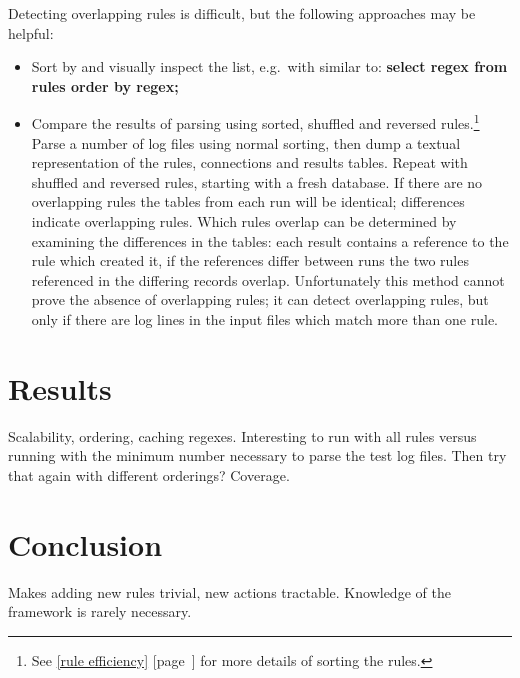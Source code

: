 \documentclass[]{svmult}
\newcommand{\refwithpage}[1]{%
    \empty{}\ref{#1} [page~\pageref{#1}]%
}
\newcommand{\sectionref}[1]{%
    \textsection{}\refwithpage{#1}%
}
\begin{document}
Detecting overlapping rules is difficult, but the following approaches may
be helpful:

\begin{itemize}

    \item Sort by \regex{} and visually inspect the list, e.g.\ with \SQL{}
        similar to: \textbf{select regex from rules order by regex;}

    \item Compare the results of parsing using sorted, shuffled and
        reversed rules.\footnote{See \sectionref{rule efficiency} for more
        details of sorting the rules.}  Parse a number of log files using
        normal sorting, then dump a textual representation of the rules,
        connections and results tables.  Repeat with shuffled and reversed
        rules, starting with a fresh database.  If there are no overlapping
        rules the tables from each run will be identical; differences
        indicate overlapping rules.  Which rules overlap can be determined
        by examining the differences in the tables: each result contains a
        reference to the rule which created it, if the references differ
        between runs the two rules referenced in the differing records
        overlap.  Unfortunately this method cannot prove the absence of
        overlapping rules; it can detect overlapping rules, but only if
        there are log lines in the input files which match more than one
        rule.

\end{itemize}


\section{Results}

Scalability, ordering, caching regexes.  Interesting to run with all rules
versus running with the minimum number necessary to parse the test log
files.  Then try that again with different orderings?  Coverage.

\section{Conclusion}

Makes adding new rules trivial, new actions tractable.  Knowledge of the
framework is rarely necessary.



\label{bibliography}

\renewcommand{\glossarytitle}{\section{Glossary}\label{Glossary}}
\printglossary{}
\renewcommand{\glossarytitle}{\section{Acronyms}\label{Acronyms}}
\printacronym{}
\end{document}
